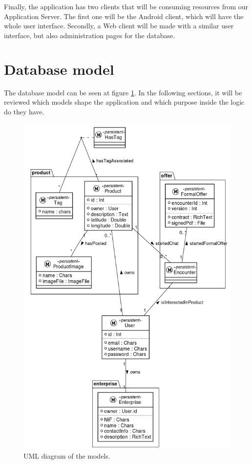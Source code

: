 \documentclass[./main.tex]{subfiles}
\begin{document}
Finally, the application has two clients that will be consuming
resources from our Application Server. The first one will be the Android
client, which will have the whole user interface. Secondly, a Web client
will be made with a similar user interface, but also administration
pages for the database.

\section{Database model}

The database model can be seen at figure \ref{fig:model-uml}. In the following
sections, it will be reviewed which models shape the application and
which purpose inside the logic do they have.

\begin{figure}[h]
\centering
\includegraphics[width=0.9\linewidth]{img/database-model.png}
\caption{UML diagram of the models.}
\label{fig:model-uml}
\end{figure}
\end{document}
